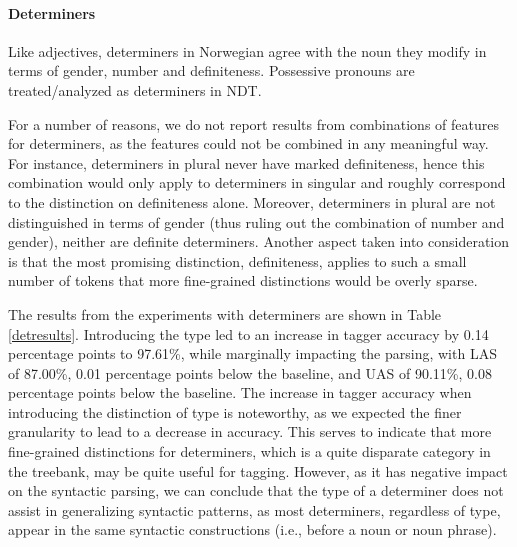 \documentclass[11pt,a4paper]{article}
\begin{document}
\paragraph{Determiners}
Like adjectives, determiners in Norwegian agree with the noun they modify in
terms of gender, number and definiteness. Possessive pronouns are
treated/analyzed as determiners in NDT.

For a number of reasons, we do not report results from combinations of features
for determiners, as the features could not be combined in any meaningful way.
For instance, determiners in plural never have marked definiteness, hence this
combination would only apply to determiners in singular and roughly correspond
to the distinction on definiteness alone. Moreover, determiners in plural are
not distinguished in terms of gender (thus ruling out the combination of number
and gender), neither are definite determiners. Another aspect taken into
consideration is that the most promising distinction, definiteness, applies to
such a small number of tokens that more fine-grained distinctions would be
overly sparse.

The results from the experiments with determiners are shown in Table
\ref{detresults}.  Introducing the type led to an increase in tagger accuracy
by 0.14 percentage points to 97.61\%, while marginally impacting the parsing,
with LAS of 87.00\%, 0.01 percentage points below the baseline, and UAS of
90.11\%, 0.08 percentage points below the baseline.
The increase in tagger
accuracy when introducing the distinction of type is noteworthy, as we expected
the finer granularity to lead to a decrease in accuracy. This serves to
indicate that more fine-grained distinctions for determiners, which is a quite
disparate category in the treebank, may be quite useful for tagging. However,
as it has negative impact on the syntactic parsing, we can conclude that the
type of a determiner does not assist in generalizing syntactic patterns, as
most determiners, regardless of type, appear in the same syntactic
constructions (i.e., before a noun or noun phrase).
\end{document}
